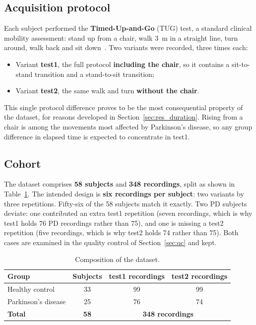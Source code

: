 \subsection{Acquisition protocol}

Each subject performed the \textbf{Timed-Up-and-Go} (TUG) test, a standard
clinical mobility assessment: stand up from a chair, walk 3~m in a straight
line, turn around, walk back and sit down~\cite{lopezdelgado2026}. Two
variants were recorded, three times each:

\begin{itemize}
  \item Variant \textbf{test1}, the full protocol \textbf{including the chair}, so it
        contains a sit-to-stand transition and a stand-to-sit transition;
  \item Variant \textbf{test2}, the same walk and turn \textbf{without the chair}.
\end{itemize}

\noindent This single protocol difference proves to be the most consequential
property of the dataset, for reasons developed in Section~\ref{sec:res_duration}.
Rising from a chair is among the movements most affected by Parkinson's disease,
so any group difference in elapsed time is expected to concentrate in test1.

\subsection{Cohort}

The dataset comprises \textbf{58 subjects} and \textbf{348 recordings}, split
as shown in Table~\ref{tab:cohort}. The intended design is \textbf{six
recordings per subject}: two variants by three repetitions. Fifty-six of the
58 subjects match it exactly. Two PD subjects deviate: one contributed an
extra test1 repetition (seven recordings, which is why test1 holds 76 PD
recordings rather than 75), and one is missing a test2 repetition (five
recordings, which is why test2 holds 74 rather than 75). Both cases are
examined in the quality control of Section~\ref{sec:qc} and kept.

\begin{table}[H]
  \centering
  \caption[Composition of the dataset]{Composition of the dataset.}
  \label{tab:cohort}
  \begin{tabular}{lccc}
    \toprule
    \textbf{Group} & \textbf{Subjects} & \textbf{test1 recordings} & \textbf{test2 recordings} \\
    \midrule
    Healthy control     & 33 & 99 & 99 \\
    Parkinson's disease & 25 & 76 & 74 \\
    \midrule
    \textbf{Total}      & \textbf{58} & \multicolumn{2}{c}{\textbf{348 recordings}} \\
    \bottomrule
  \end{tabular}
\end{table}

